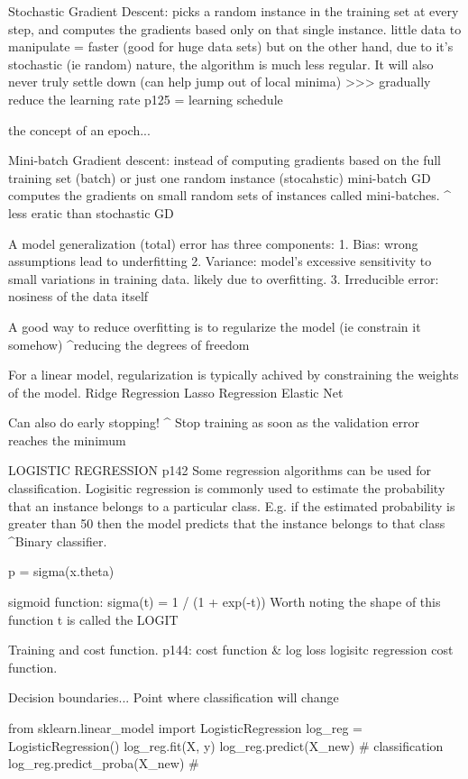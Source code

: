 Stochastic Gradient Descent:
picks a random instance in the training set at every step,
and computes the gradients based only on that single instance.
little data to manipulate = faster (good for huge data sets)
but on the other hand,
due to it's stochastic (ie random) nature,
the algorithm is much less regular.
It will also never truly settle down (can help jump out of local minima)
>>> gradually reduce the learning rate p125 = learning schedule

the concept of an epoch...

Mini-batch Gradient descent:
instead of computing gradients based on the full training set (batch)
or just one random instance (stocahstic)
mini-batch GD computes the gradients on small random sets of instances called mini-batches.
^ less eratic than stochastic GD

A model generalization (total) error has three components:
1. Bias: wrong assumptions lead to underfitting
2. Variance: model's excessive sensitivity to small variations in training data. likely due to overfitting.
3. Irreducible error: nosiness of the data itself


A good way to reduce overfitting is to regularize the model (ie constrain it somehow)
^reducing the degrees of freedom

For a linear model, regularization is typically achived by constraining the weights of the model.
Ridge Regression
Lasso Regression
Elastic Net

Can also do early stopping!
^ Stop training as soon as the validation error reaches the minimum

LOGISTIC REGRESSION p142
Some regression algorithms can be used for classification.
Logisitic regression is commonly used to estimate the probability that
an instance belongs to a particular class.
E.g. if the estimated probability is greater than 50%
then the model predicts that the instance belongs to that class
^Binary classifier.

p = sigma(x.theta)

sigmoid function:
sigma(t) = 1 / (1 + exp(-t))
Worth noting the shape of this function
t is called the LOGIT

Training and cost function.
p144: cost function & log loss logisitc regression cost function.

Decision boundaries...
Point where classification will change

from sklearn.linear_model import LogisticRegression
log_reg = LogisticRegression()
log_reg.fit(X, y)
log_reg.predict(X_new) # classification
log_reg.predict_proba(X_new) # 

